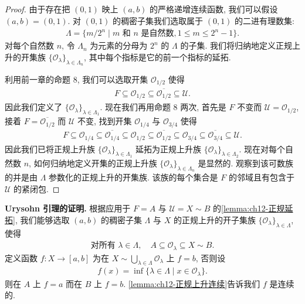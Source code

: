 \documentclass[../../main.tex]{subfiles}
\begin{document}
\begin{proof}
由于存在把 $(0,1)$ 映上 $(a,b)$ 的严格递增连续函数, 我们可以假设 $(a,b)=(0,1)$. 对 $(0,1)$ 的稠密子集我们选取属于 $(0,1)$ 的二进有理数集:
\begin{align*}
\Lambda=\{m/2^{n}\mid m\text{ 和 }n\text{ 是自然数},1\leqslant m\leqslant 2^{n}-1\}.
\end{align*}
对每个自然数 $n$, 令 $\Lambda_{n}$ 为元素的分母为 $2^{n}$ 的 $\Lambda$ 的子集. 我们将归纳地定义正规上升的开集族 $\{\mathcal{O}_{\lambda}\}_{\lambda\in\Lambda_{n}}$, 其中每个指标是它的前一个指标的延拓.

利用前一章的命题 8, 我们可以选取开集 $\mathcal{O}_{1/2}$ 使得
\begin{align*}
F\subseteq\mathcal{O}_{1/2}\subseteq\overline{\mathcal{O}_{1/2}}\subseteq\mathcal{U}.
\end{align*}
因此我们定义了 $\{\mathcal{O}_{\lambda}\}_{\lambda\in\Lambda_{1}}$. 现在我们再用命题 8 两次, 首先是 $F$ 不变而 $\mathcal{U}=\mathcal{O}_{1/2}$, 接着 $F=\overline{\mathcal{O}_{1/2}}$ 而 $\mathcal{U}$ 不变, 找到开集 $\mathcal{O}_{1/4}$ 与 $\mathcal{O}_{3/4}$ 使得
\begin{align*}
F\subseteq\mathcal{O}_{1/4}\subseteq\overline{\mathcal{O}_{1/4}}\subseteq\mathcal{O}_{1/2}\subseteq\overline{\mathcal{O}_{1/2}}\subseteq\mathcal{O}_{3/4}\subseteq\overline{\mathcal{O}_{3/4}}\subseteq\mathcal{U}.
\end{align*}
因此我们已将正规上升族 $\{\mathcal{O}_{\lambda}\}_{\lambda\in\Lambda_{1}}$ 延拓为正规上升族 $\{\mathcal{O}_{\lambda}\}_{\lambda\in\Lambda_{2}}$. 现在对每个自然数 $n$, 如何归纳地定义开集的正规上升族 $\{\mathcal{O}_{\lambda}\}_{\lambda\in\Lambda_{n}}$ 是显然的. 观察到该可数族的并是由 $\Lambda$ 参数化的正规上升的开集族. 该族的每个集合是 $F$ 的邻域且有包含于 $\mathcal{U}$ 的紧闭包.
\end{proof}

\textbf{Urysohn 引理的证明.} 根据应用于 $F=A$ 与 $\mathcal{U}=X\sim B$ 的\cref{lemma:ch12-正规延拓}, 我们能够选取 $(a,b)$ 的稠密子集 $\Lambda$ 与 $X$ 的正规上升的开子集族 $\{\mathcal{O}_{\lambda}\}_{\lambda\in\Lambda}$, 使得
\begin{align*}
\text{对所有 }\lambda\in\Lambda,\quad A\subseteq\mathcal{O}_{\lambda}\subseteq X\sim B.
\end{align*}
定义函数 $f:X\to[a,b]$ 为在 $X\sim\bigcup_{\lambda\in\Lambda}\mathcal{O}_{\lambda}$ 上 $f=b$, 否则设
\begin{align*}
f(x)=\inf\{\lambda\in\Lambda\mid x\in\mathcal{O}_{\lambda}\}.
\end{align*}
则在 $A$ 上 $f=a$ 而在 $B$ 上 $f=b$. \cref{lemma:ch12-正规上升连续}告诉我们 $f$ 是连续的.
\end{document}
